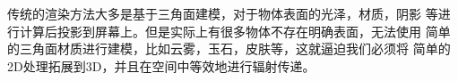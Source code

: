 
传统的渲染方法大多是基于三角面建模，对于物体表面的光泽，材质，阴影
等进行计算后投影到屏幕上。但是实际上有很多物体不存在明确表面，无法使用
简单的三角面材质进行建模，比如云雾，玉石，皮肤等，这就逼迫我们必须将
简单的2D处理拓展到3D，并且在空间中等效地进行辐射传递。